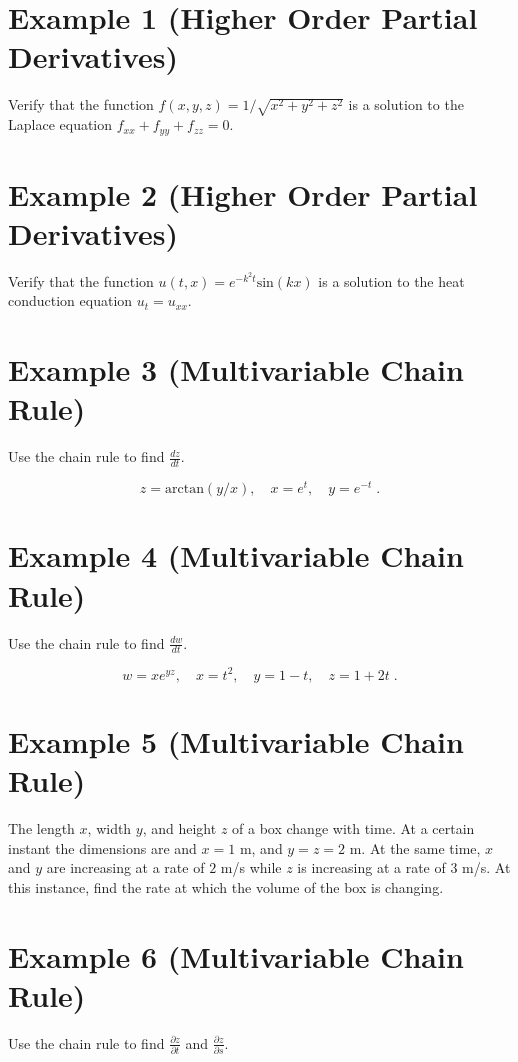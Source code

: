 \documentclass[11pt]{article}
\begin{document}
\section*{Example 1 (Higher Order Partial Derivatives)}

Verify that the function $f(x,y,z) = 1/\sqrt{x^2+y^2+z^2}$ is a solution to the Laplace equation $f_{xx} + f_{yy} + f_{zz} = 0$. 


\section*{Example 2 (Higher Order Partial Derivatives)}

Verify that the function $u(t,x) = e^{-k^2t}\text{sin}(kx)$ is a solution to the heat conduction equation $u_t = u_{xx}$. 

\section*{Example 3 (Multivariable Chain Rule)}

Use the chain rule to find $\frac{dz}{dt}$.

$$z = \text{arctan}(y/x), \quad x = e^t, \quad y = e^{-t} \;.$$

\section*{Example 4 (Multivariable Chain Rule)}

Use the chain rule to find $\frac{dw}{dt}$.

$$w = xe^{yz},\quad x = t^2, \quad y = 1-t,\quad z = 1+2t\;.$$

\section*{Example 5 (Multivariable Chain Rule)}

The length $x$, width $y$, and height $z$ of a box change with time. At a certain instant the dimensions are and $x = 1$ m, and $y = z = 2$ m. At the same time, $x$ and $y$ are increasing at a rate of $2$ m/s while $z$ is increasing at a rate of $3$ m/s. At this instance, find the rate at which the volume of the box is changing.

\section*{Example 6 (Multivariable Chain Rule)}

Use the chain rule to find $\frac{\partial z}{\partial t}$ and $\frac{\partial z}{\partial s}$.
\end{document}
